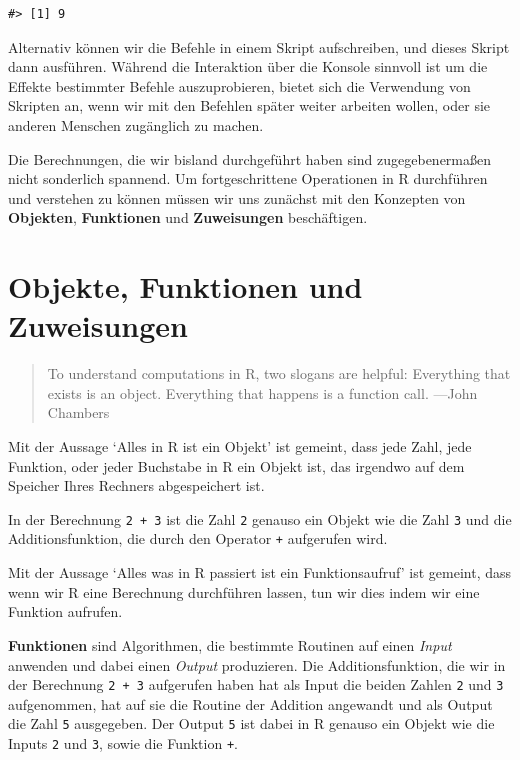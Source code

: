 \documentclass[]{book}
\begin{document}
\begin{verbatim}
#> [1] 9
\end{verbatim}

Alternativ können wir die Befehle in einem Skript aufschreiben, und
dieses Skript dann ausführen. Während die Interaktion über die Konsole
sinnvoll ist um die Effekte bestimmter Befehle auszuprobieren, bietet
sich die Verwendung von Skripten an, wenn wir mit den Befehlen später
weiter arbeiten wollen, oder sie anderen Menschen zugänglich zu machen.

Die Berechnungen, die wir bisland durchgeführt haben sind
zugegebenermaßen nicht sonderlich spannend. Um fortgeschrittene
Operationen in R durchführen und verstehen zu können müssen wir uns
zunächst mit den Konzepten von \textbf{Objekten}, \textbf{Funktionen}
und \textbf{Zuweisungen} beschäftigen.

\section{Objekte, Funktionen und
Zuweisungen}\label{objekte-funktionen-und-zuweisungen}

\begin{quote}
To understand computations in R, two slogans are helpful: Everything
that exists is an object. Everything that happens is a function call.
---John Chambers
\end{quote}

Mit der Aussage `Alles in R ist ein Objekt' ist gemeint, dass jede Zahl,
jede Funktion, oder jeder Buchstabe in R ein Objekt ist, das irgendwo
auf dem Speicher Ihres Rechners abgespeichert ist.

In der Berechnung \texttt{2\ +\ 3} ist die Zahl \texttt{2} genauso ein
Objekt wie die Zahl \texttt{3} und die Additionsfunktion, die durch den
Operator \texttt{+} aufgerufen wird.

Mit der Aussage `Alles was in R passiert ist ein Funktionsaufruf' ist
gemeint, dass wenn wir R eine Berechnung durchführen lassen, tun wir
dies indem wir eine Funktion aufrufen.

\textbf{Funktionen} sind Algorithmen, die bestimmte Routinen auf einen
\emph{Input} anwenden und dabei einen \emph{Output} produzieren. Die
Additionsfunktion, die wir in der Berechnung \texttt{2\ +\ 3} aufgerufen
haben hat als Input die beiden Zahlen \texttt{2} und \texttt{3}
aufgenommen, hat auf sie die Routine der Addition angewandt und als
Output die Zahl \texttt{5} ausgegeben. Der Output \texttt{5} ist dabei
in R genauso ein Objekt wie die Inputs \texttt{2} und \texttt{3}, sowie
die Funktion \texttt{+}.
\end{document}
